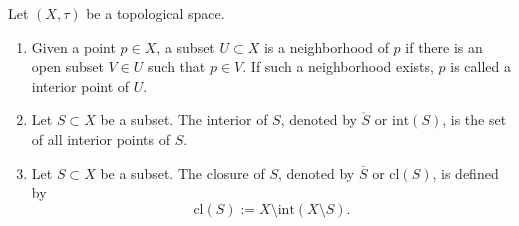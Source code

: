 \begin{defbox}
    \begin{definition}
        Let \((X, \tau)\) be a topological space.
        \begin{enumerate}
            \item Given a {\color{mathobj}point} \(p \in X\), a subset \(U \subset X\) is a neighborhood of \(p\) if there is an open subset \(V \in U\) such that \(p \in V\). If such a neighborhood exists, \(p\) is called a interior point of \(U\).
            \item Let \(S \subset X\) be a subset. The interior of \(S\), denoted by \(\mathring{S}\) or \(\mathrm{int}(S)\), is the {\color{mathobj}set} of all interior points of \(S\).
            \item Let \(S \subset X\) be a subset. The closure of \(S\), denoted by \(\overline{S}\) or \(\mathrm{cl}(S)\), is defined by
            \begin{equation*}
                \mathrm{cl}(S) := X \setminus \mathrm{int}(X \setminus S) \text{.}
            \end{equation*}
        \end{enumerate}
    \end{definition}
\end{defbox}
\newpage
